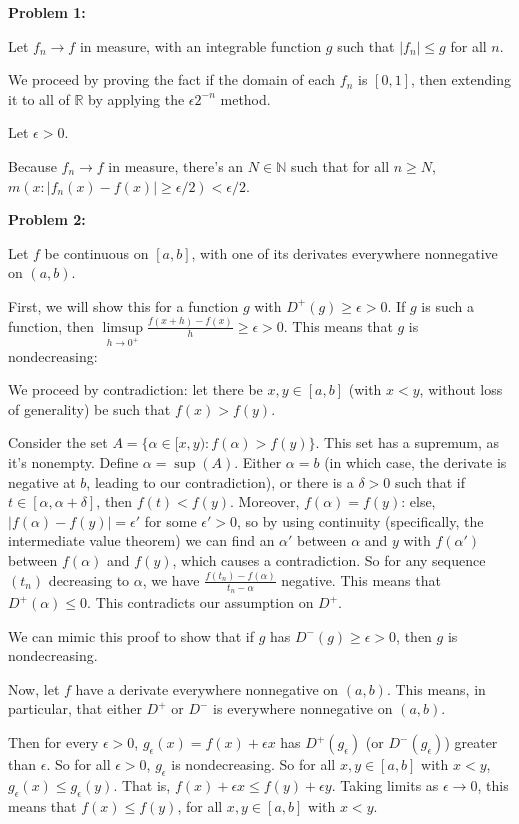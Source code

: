 \documentclass[a4paper,12pt]{article}
\newcommand{\tab}{\hspace{4mm}} %
\newcommand{\shunt}{\vspace{20mm}}
\newcommand{\absval}[1]{\left\lvert #1 \right\rvert}
\newcommand{\al}{\alpha} %
\newcommand{\de}{\delta}
\newcommand{\ep}{\epsilon}
\newcommand{\N}{\mathbb{N}}
\newcommand{\R}{\mathbb{R}}
\begin{document}
{\bf Problem 1:} 

Let $f_n \to f$ in measure, with an integrable function $g$ such that $\absval{f_n} \leq g$ for all $n$.

We proceed by proving the fact if the domain of each $f_n$ is $[0,1]$, then extending it to all of $\R$ by applying the $\ep 2^{-n}$ method.

Let $\ep>0$.

Because $f_n \to f$ in measure, there's an $N \in \N$ such that for all $n \geq N$, $m(x: \absval{f_n(x)-f(x)} \geq \ep/2) < \ep/2$. 

\shunt

{\bf Problem 2:}

Let $f$ be continuous on $[a,b]$, with one of its derivates everywhere nonnegative on $(a,b)$.

First, we will show this for a function $g$ with $D^+(g) \geq \ep >0$. If $g$ is such a function, then $\limsup\limits_{h \to 0^+} \frac{f(x+h)-f(x)}{h} \geq \ep> 0$. This means that $g$ is nondecreasing:

\tab We proceed by contradiction: let there be $x,y \in [a,b]$ (with $x<y$, without loss of generality) be such that $f(x) > f(y)$.

\tab Consider the set $A = \{\al \in [x,y): f(\al) > f(y)\}$. This set has a supremum, as it's nonempty. Define $\al =\sup(A)$. Either $\al = b$ (in which case, the derivate is negative at $b$, leading to our contradiction), or there is a $\de>0$ such that if $t \in [\al, \al+\de]$, then $f(t) < f(y)$. Moreover, $f(\al) = f(y)$: else, $\absval{f(\al) - f(y)} = \ep'$ for some $\ep' >0$, so by using continuity (specifically, the intermediate value theorem) we can find an $\al'$ between $\al$ and $y$ with $f(\al')$ between $f(\al)$ and $f(y)$, which causes a contradiction. So for any sequence $(t_n)$ decreasing to $\al$, we have $\frac{f(t_n) - f(\al)}{t_n - \al}$ negative. This means that $D^+(\al) \leq 0$. This contradicts our assumption on $D^+$.

We can mimic this proof to show that if $g$ has $D^-(g) \geq \ep >0$, then $g$ is nondecreasing.

Now, let $f$ have a derivate everywhere nonnegative on $(a,b)$. This means, in particular, that either $D^+$ or $D^-$ is everywhere nonnegative on $(a,b)$.

Then for every $\ep>0$, $g_\ep(x) = f(x) + \ep x$ has $D^+(g_\ep)$ (or $D^-(g_\ep)$) greater than $\ep$. So for all $\ep>0$, $g_\ep$ is nondecreasing. So for all $x,y \in [a,b]$ with $x<y$, $g_\ep(x) \leq g_\ep(y)$. That is, $f(x) + \ep x \leq f(y) + \ep y$. Taking limits as $\ep \to 0$, this means that $f(x) \leq f(y)$, for all $x,y \in [a,b]$ with $x<y$.
\end{document}
